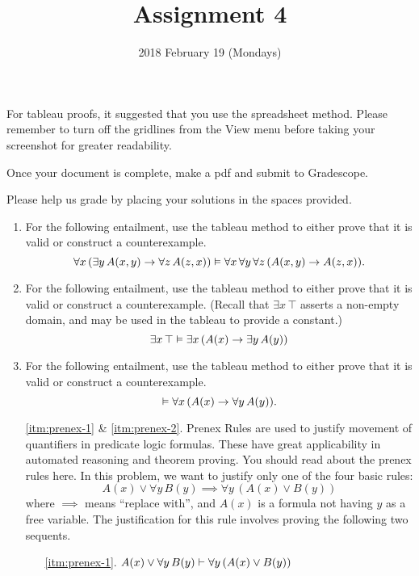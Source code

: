 \documentclass{cs81-homework}
\author{}
\title{Assignment 4}
\date{2018 February 19 (Mondays)}
\begin{document}
\begin{introduction}
  \theintroduction

  For tableau proofs, it suggested that you use the spreadsheet method. Please
  remember to turn off the gridlines from the View menu before taking your
  screenshot for greater readability.

  Once your document is complete, make a pdf and submit to Gradescope.

  Please help us grade by placing your solutions in the spaces provided.
\end{introduction}

\begin{enumerate}
\item {} For the following entailment, use the tableau method to either
  prove that it is valid or construct a counterexample.
  \[
    \forall x \, (\exists y \, A(x, y) \to \forall z \, A(z, x)) \vDash
    \forall x \, \forall y \, \forall z \, (A(x, y) \to A(z, x)).
  \]

  \begin{solution}
  \end{solution}

\item {} For the following entailment, use the tableau method to either
  prove that it is valid or construct a counterexample. (Recall that
  \(\exists x \, \top\) asserts a non-empty domain, and may be used in the
  tableau to provide a constant.)
  \[
    \exists x \, \top \vDash \exists x \, (A(x) \to \exists y \, A(y))
  \]

  \begin{solution}
  \end{solution}

\item {} For the following entailment, use the tableau method to either
  prove that it is valid or construct a counterexample.
  \[
    \vDash \forall x \, (A(x) \to \forall y \, A(y)).
  \]

  \begin{solution}
  \end{solution}

\item[\ref{itm:prenex-1} \& \ref{itm:prenex-2}.] Prenex Rules are used to
  justify movement of quantifiers in predicate logic formulas. These have great
  applicability in automated reasoning and theorem proving. You should read
  about the prenex rules here. In this problem, we want to justify only one of
  the four basic rules:
  \[
    A(x) \lor \forall y \, B(y) \implies \forall y \, (A(x) \lor B(y))
  \]
  where \(\implies\) means ``replace with'', and \(A(x)\) is a formula not
  having \(y\) as a free variable.  The justification for this rule involves
  proving the following two sequents.
  \begin{enumerate}
  \item[\ref{itm:prenex-1}.]
    \(A(x) \lor \forall y \, B(y) \vdash \forall y \, (A(x) \lor B(y))\)
      

\end{enumerate}
\end{enumerate}
\end{document}
